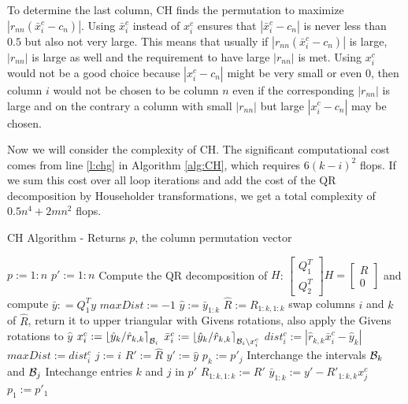 \documentclass[12pt,Bold,letterpaper]{mcgilletdclass}
\newcommand{\bsmx}{\left[\begin{smallmatrix}}
\newcommand{\esmx}{\end{smallmatrix}\right]}
\begin{document}
To determine the last column, CH finds the permutation to 
maximize $\left |r_{nn}(\bar{x}_i^c-c_n) \right |$. Using $\bar{x}_i^c$ instead of $x_i^c$
ensures that $\left | \bar{x}_i^c-c_n \right |$ is never less than $0.5$ but
also not very large. This means that usually if $\left | r_{nn}(\bar{x}_i^c-c_n)
\right |$ is large, $\left | r_{nn} \right |$ is large as well and the
requirement to have large $|r_{nn}|$ %
is met.
Using $x_i^c$ would not be a good choice because $\left | x_i^c - c_n \right |$ might be 
very small or even $0$, then column $i$ would not be chosen to be column $n$
even if the corresponding $|r_{nn}|$ is large and on the contrary a column with small $|r_{nn}|$
but large $|x_i^c-c_n|$ may be chosen.

Now we will consider the complexity of CH. The 
significant computational cost comes from line \ref{l:chg} in Algorithm \ref{alg:CH},
which requires $6(k-i)^2$ flops.
If we sum this cost over all loop iterations and add the cost of the QR decomposition by Householder transformations, 
we  get a total complexity of $0.5n^4+2mn^2$ flops.

\begin{algorithm}
\caption{CH Algorithm - Returns $p$, the column permutation vector}
\label{alg:CH}
\begin{algorithmic}[1]
\STATE $p := 1:n$
\STATE $p' := 1:n$
\STATE Compute the QR decomposition of $H$: $\bsmx Q_1^T \\ Q_2^T \esmx H= \bsmx R\\ 0 \esmx$
             and compute  $\bar{y} : = Q_1^Ty$
  	\STATE $maxDist := -1$
    	\STATE $\hat{y} := \bar{y}_{1:k}$
    	\STATE $\hat{R} := R_{1:k,1:k}$
        \STATE  \label{l:chg} swap columns $i$ and $k$ of $\hat{R}$, return it  to upper
triangular with Givens rotations, also apply the Givens rotations to $\hat{y}$ %
        \STATE $x_i^c := \left \lfloor\hat{y}_k/\hat{r}_{k,k}\right
\rceil_{{\cal B}_i}$
        \STATE $\bar{x}_i^c := \left \lfloor\hat{y}_k/\hat{r}_{k,k}\right
\rceil_{{\cal B}_i\backslash x_i^c}$
        \STATE $dist_i^c := \left | \hat{r}_{k,k}\bar{x}_i^c - \hat{y}_k
\right | $
        	\STATE $maxDist := dist_i^c$
        	\STATE $j := i$
        	\STATE $R' := \hat{R}$
        	\STATE $y' := \hat{y}$
        \ENDIF
    \ENDFOR
    \STATE $p_k := p'_j$
    \STATE Interchange the intervals ${{\cal B}_k}$ and ${{\cal B}_{j}}$
    \STATE Intechange entries $k$ and $j$ in $p'$
    \STATE $R_{1:k,1:k} := R'$
    \STATE $\bar{y}_{1:k} := y' - R'_{1:k,k}x_j^c$
  \ENDFOR
  \STATE $p_1 := p'_1$
\end{algorithmic}
\end{algorithm}
\end{document}
